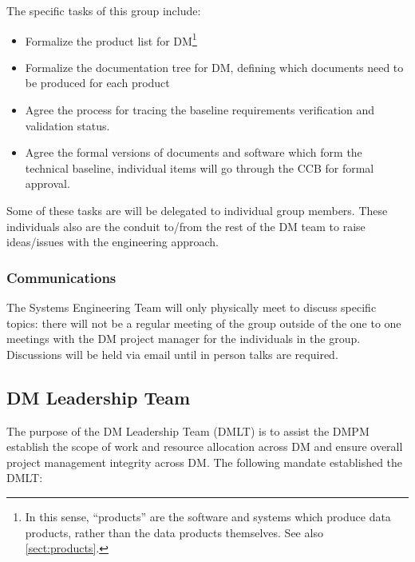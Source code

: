 The specific tasks of this group include:

\begin{itemize}
\item Formalize the product list for DM\footnote{In this sense, ``products'' are the software and systems which produce data products, rather than the data products themselves. See also \ref{sect:products}.}
\item Formalize the documentation tree for DM, defining which documents need to be produced for each product
\item Agree the process for tracing the baseline requirements verification and validation status.
\item Agree the formal versions of documents and software which form the technical baseline, individual items will go through the CCB for formal approval.
\end{itemize}

Some of these tasks are will be delegated to individual group members.
These individuals also are the conduit to/from the rest of the DM team to raise ideas/issues with the engineering approach.

\subsubsection{Communications}

The Systems Engineering Team will only physically meet to discuss specific topics: there will not be a regular meeting of the group outside of the one to one meetings with the DM project manager for the individuals in the group.
Discussions will be held via email until in person talks are required.

\subsection{DM Leadership Team \label{sect:dmlt}}

The purpose of the DM Leadership Team (DMLT) is to assist the DMPM  establish the scope of work and resource allocation across DM and ensure overall project management integrity across DM.
The following mandate established the DMLT:


